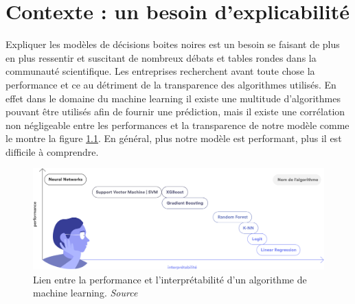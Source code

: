 \chapter{Contexte : un besoin d'explicabilité}
Expliquer les modèles de décisions boites noires est un besoin se faisant de plus en plus ressentir et suscitant de nombreux débats et tables rondes dans la communauté scientifique. Les entreprises recherchent avant toute chose la performance et ce au détriment de la transparence des algorithmes utilisés. En effet dans le domaine du machine learning il existe une multitude d'algorithmes pouvant être utilisés afin de fournir une prédiction, mais il existe une corrélation non négligeable entre les performances et la transparence de notre modèle comme le montre la figure \ref{performanceAndInterpretabilite}. En général, plus notre modèle est performant, plus il est difficile à comprendre.\par

\begin{figure}[h]
\centering
\includegraphics[scale=0.15]{src_img/performanceAndInterpretabilite.png}
\caption{Lien entre la performance et l'interprétabilité d'un algorithme de machine learning. \textit{Source \cite{hippocrate}}}
\label{performanceAndInterpretabilite}
\end{figure}

